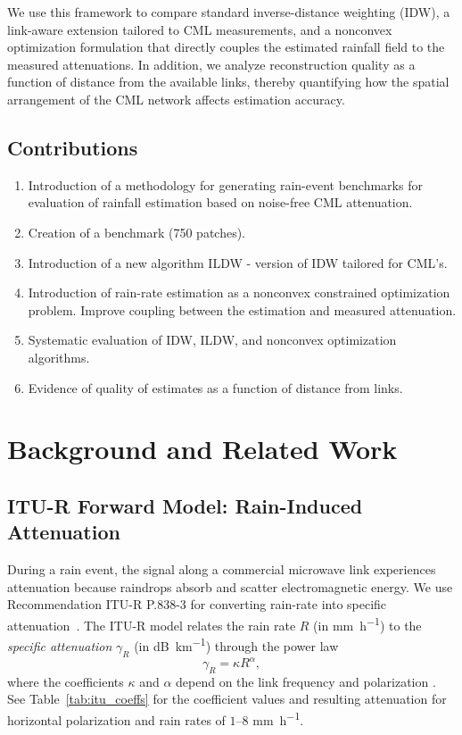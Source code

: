 \documentclass[a4paper,fleqn]{cas-sc}
\newcommand{\notebox}[3]{%
  \begingroup
  \setlength{\fboxsep}{2pt}%
  \fcolorbox{#1}{#2}{\textsf{\footnotesize #3}}%
  \endgroup
}
\DeclareRobustCommand{\editnote}[1]{%
  \texorpdfstring{%
    \nobreak\hfill
    \mbox{\notebox{red!50!black}{red!10}{#1}}%
  }{}%
}
\renewcommand{\editnote}[1]{}
\begin{document}
We use this framework to compare standard inverse-distance weighting (IDW), a link-aware extension tailored to CML measurements, and a nonconvex optimization formulation that directly couples the estimated rainfall field to the measured attenuations.\editnote{AK: We should cite something for the other two methods} In addition, we analyze reconstruction quality as a function of distance from the available links, thereby quantifying how the spatial arrangement of the CML network affects estimation accuracy.

\subsection{Contributions}
\begin{enumerate}
  \item Introduction of a methodology for generating rain-event benchmarks for evaluation of rainfall estimation based on noise-free CML attenuation.
  \item Creation of a benchmark (750 patches).
  \item Introduction of a new algorithm ILDW - version of IDW tailored for CML's.
  \item Introduction of rain-rate estimation as a nonconvex constrained optimization problem. Improve coupling between the estimation and measured attenuation.
  \item Systematic evaluation of IDW, ILDW, and nonconvex optimization algorithms.
  \item Evidence of quality of estimates as a function of distance from links.

\end{enumerate}
\section{Background and Related Work}
\subsection{ITU-R Forward Model: Rain-Induced Attenuation }

During a rain event, the signal along a commercial microwave link experiences attenuation because raindrops absorb and scatter electromagnetic energy.
We use Recommendation ITU-R P.838-3 for converting rain-rate into specific attenuation~\citep{ITU}. The ITU-R model relates the rain rate $R$ (in \si{\milli\meter\per\hour})
to the \emph{specific attenuation} $\gamma_R$ (in \si{\deci\bel\per\kilo\meter}) through the power law
\begin{equation}\label{eq:ITU}
  \gamma_R = \kappa R^{\alpha},
\end{equation}
where the coefficients $\kappa$ and $\alpha$ depend on the link frequency and polarization \citep{ITU}. See Table~\ref{tab:itu_coeffs} for the coefficient values and resulting attenuation for horizontal polarization and rain rates of $1$--$8$ \si{\milli\meter\per\hour}.
\end{document}
